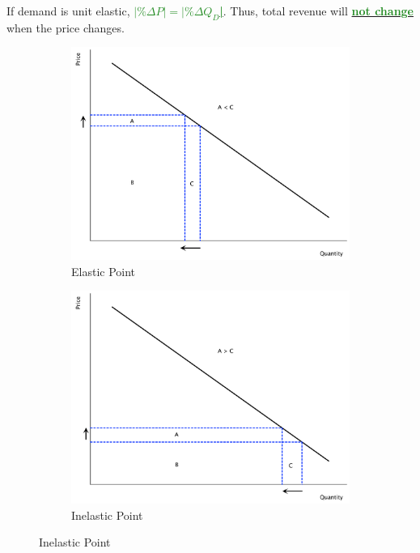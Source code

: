 \documentclass[11pt]{article}\usepackage[]{graphicx}\usepackage[]{color}
\theoremstyle{definition}
\newcommand{\dd}[1]{{\underline{\textbf{\textcolor{ForestGreen}{#1}}}}}
\begin{document}
	If demand is unit elastic, \dd{$|\% \Delta P| = |\%\Delta Q_D$|}. Thus, total revenue will \dd{not change} when the price changes.
	
	
		\begin{figure}[H]
			\centering
			\caption{Comparing Demand Elasticities and Total Revenue}
			\begin{subfigure}{.3\textwidth}
				\includegraphics[scale=.3]{plot27.pdf}
				\caption{Elastic Point}
			\end{subfigure}%
			\begin{subfigure}{.3\textwidth}
				\centering
				\includegraphics[scale=.3]{plot29.pdf}
				\caption{Inelastic Point}
			\end{subfigure}

\end{figure}
\end{document}

